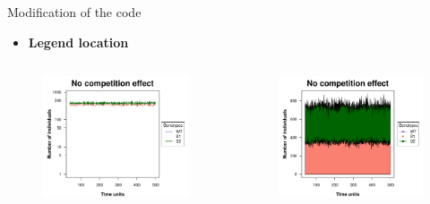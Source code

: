 \begin{frame}{Modification of the code}
	\begin{itemize}
		\item \textbf{Legend location}
	\end{itemize}
	\begin{columns}
		\begin{column}{0.5\textwidth}
			\begin{figure}
				\includegraphics[width=0.99\linewidth]{img/line_example.pdf}
			\end{figure}
		\end{column}
		\begin{column}{0.5\textwidth}
			\begin{figure}
				\includegraphics[width=0.99\linewidth]{img/stream_example.pdf}
			\end{figure}
		\end{column}
	\end{columns}
\end{frame}
